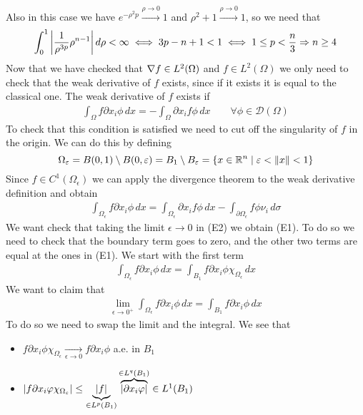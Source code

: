 Also in this case we have \(e^{-\rho^2 p} \overset{\rho \to 0}{\longrightarrow} 1\) and \(\rho^2 + 1 \overset{\rho \to 0}{\longrightarrow} 1\), so we need that
\[
    \begin{split}
        \int_0^1 \abs{\frac{1} {\rho^{3p}} \rho^{n-1}} \, d\rho < \infty \iff 3p - n + 1 < 1 \iff 1 \leq p < \frac{n}{3} \Rightarrow n \geq 4
    \end{split}
\]
Now that we have checked that \(\nabla f \in L^2(\Omega)\) and \(f \in L^2(\Omega)\) we only need to check that the weak derivative of \(f\) exists, since if it exists it is equal to the classical one. The weak derivative of \(f\) exists if
\[
    \begin{split}
        \int_\Omega f \partial x_i \phi \, dx = - \int_\Omega \partial x_i f \phi \, dx \qquad \forall \phi \in \mathcal{D}(\Omega)
    \end{split}
    \tag*{E1}
\]
To check that this condition is satisfied we need to cut off the singularity of \(f\) in the origin. We can do this by defining
\[
    \Omega_\varepsilon = B(0, 1) \setminus B(0, \varepsilon) = B_1 \setminus B_\varepsilon = \left\{ x \in \mathbb{R}^n \mid \varepsilon < \norm{x} < 1 \right\}
\]
Since \(f \in C^1(\Omega_\epsilon)\) we can apply the divergence theorem to the weak derivative definition and obtain
\[
    \begin{split}
        \int_{\Omega_\epsilon} f \partial x_i \phi \, dx = \int_{\Omega_\epsilon} \partial x_i f \phi \, dx - \int_{\partial\Omega_\epsilon} f \phi \nu_i \, d\sigma
    \end{split}
    \tag*{E2}
\]
We want check that taking the limit \(\epsilon \to 0\) in (E2) we obtain (E1). To do so we need to check that the boundary term goes to zero, and the other two terms are equal at the ones in (E1). We start with the first term
\[
    \begin{split}
        \int_{\Omega_\epsilon} f \partial x_i \phi \, dx = \int_{B_1} f \partial x_i \phi \chi_{\Omega_\epsilon} \, dx
    \end{split}
\]
We want to claim that 
\[
    \begin{split}
        \lim_{\epsilon \to 0^+} \int_{\Omega_\epsilon} f \partial x_i \phi \, dx = \int_{B_1} f \partial x_i \phi \, dx
    \end{split}
\]
To do so we need to swap the limit and the integral. We see that 
\begin{itemize}
    \item \(f \partial x_i \phi \chi_{\Omega_\epsilon} \underset{\epsilon \to 0}{\longrightarrow} f \partial x_i \phi\) a.e. in \(B_1\)
    \item \(\abs{f \partial x_i \varphi \chi_{\Omega_\varepsilon}} \leq \underbrace{\abs{f}}_{\in L^p(B_1)} \overbrace{\abs{\partial x_i \varphi}}^{\in L^q(B_1)} \in L^1(B_1)\)
\end{itemize}
